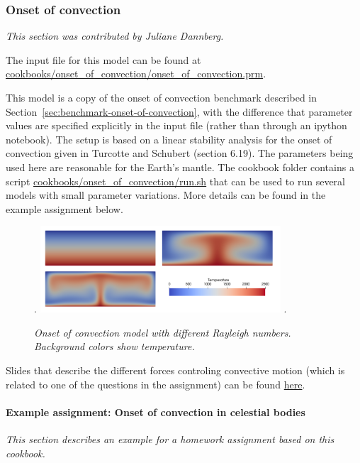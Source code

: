\subsubsection{Onset of convection}
\label{sec:cookbooks-onset-of-convection}
\textit{This section was contributed by Juliane Dannberg.}

The input file for this model can be found at \url{cookbooks/onset_of_convection/onset_of_convection.prm}.

This model is a  copy of the onset of convection benchmark described in Section~\ref{sec:benchmark-onset-of-convection}, 
with the difference that parameter values are specified explicitly in the input file (rather than through an ipython notebook). 
The setup is based on a linear stability analysis for the onset of convection given in Turcotte and Schubert \cite{TS14} (section 6.19).
The parameters being used here are reasonable for the Earth's mantle. The cookbook folder contains a script 
\url{cookbooks/onset_of_convection/run.sh} that can be used to run several models with small parameter variations.
More details can be found in the example assignment below. 

\begin{figure}[h]
\phantom.
\hfill
\includegraphics[width=0.8\textwidth]{cookbooks/onset_of_convection/doc/convection_models.png}
\hfill
\phantom.
\caption{\it Onset of convection model with different Rayleigh numbers. Background colors show temperature.}
\label{fig:convection-box-iterations}
\end{figure}

Slides that describe the different forces controling convective motion (which is related to one of the questions
in the assignment) can be found \href{https://www.dropbox.com/s/0wqtg05w7713hdz/06_geophysics_lecture_01_29.pdf?dl=0}{here}.

\paragraph{Example assignment: Onset of convection in celestial bodies}
\textit{This section describes an example for a homework assignment based on this cookbook.}

